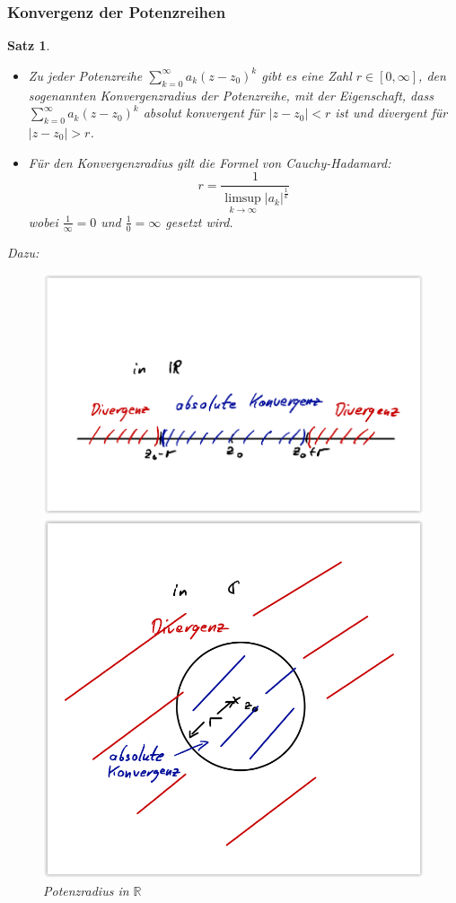 \documentclass[12pt,a4paper]{report}%
\newtheorem{satz}{Satz}[section]
\numberwithin{equation}{section}
\newcommand{\R}{\mathbb{R}} %
\numberwithin{equation}{subsection}
\begin{document}
	  \subsubsection{Konvergenz der Potenzreihen}
	  \begin{satz}$\;$ \newline \vspace{-0.5cm}
	    \begin{itemize}
	      \item[a) ] Zu jeder Potenzreihe $\sum\limits_{k = 0}^\infty a_k(z-z_0)^k$ gibt es eine Zahl $r \in [0,\infty]$, den sogenannten Konvergenzradius der Potenzreihe, mit der Eigenschaft, dass $\sum\limits_{k = 0}^\infty a_k(z-z_0)^k$ absolut konvergent für $|z-z_0| < r$ ist und divergent für $|z-z_0| > r$.
	      \item[b) ] Für den Konvergenzradius gilt die Formel von Cauchy-Hadamard:
	      \begin{equation}
	        r = \frac{1}{\limsup\limits_{k \rightarrow \infty} |a_k|^\frac{1}{k}}
	      \end{equation}
	      wobei $\frac{1}{\infty}=0$ und $\frac{1}{0} = \infty$ gesetzt wird.
	    \end{itemize}
	    Dazu:
	    \begin{figure}[H] 
				\centering
				\begin{minipage}{.5\textwidth}
				  \centering
				  \includegraphics[width=0.8\linewidth]{reihen_potenzreihen_r.png}
				  \caption{Potenzradius in $\R$ \protect\cite{HM12}}
				  \label{fig:reihe_potenzradius_r}
				\end{minipage}%
				\begin{minipage}{.5\textwidth}
				  \centering
				  \includegraphics[width=0.55\linewidth]{reihen_potenzreihen_c.png}

\end{minipage}
\end{figure}
\end{satz}
\end{document}
